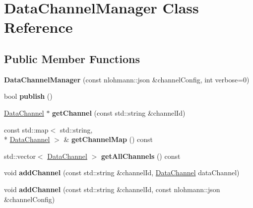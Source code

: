\hypertarget{classDataChannelManager}{\section{Data\-Channel\-Manager Class Reference}
\label{classDataChannelManager}
}
\subsection*{Public Member Functions}
\begin{DoxyCompactItemize}
\item 
\hypertarget{classDataChannelManager_a8d2879feaa1c657c3b48746938be1095}{{\bfseries Data\-Channel\-Manager} (const nlohmann\-::json \&channel\-Config, int verbose=0)}\label{classDataChannelManager_a8d2879feaa1c657c3b48746938be1095}

\item 
\hypertarget{classDataChannelManager_aecd6bf46dbee7dc4b8496c360c52e3a2}{bool {\bfseries publish} ()}\label{classDataChannelManager_aecd6bf46dbee7dc4b8496c360c52e3a2}

\item 
\hypertarget{classDataChannelManager_a523a55ba5c2f31026680f7aa7ab0e318}{\hyperlink{classDataChannel}{Data\-Channel} $\ast$ {\bfseries get\-Channel} (const std\-::string \&channel\-Id)}\label{classDataChannelManager_a523a55ba5c2f31026680f7aa7ab0e318}

\item 
\hypertarget{classDataChannelManager_a3d3c68da7e7333c2a656ae8a0672178c}{const std\-::map$<$ std\-::string, \\*
\hyperlink{classDataChannel}{Data\-Channel} $>$ \& {\bfseries get\-Channel\-Map} () const }\label{classDataChannelManager_a3d3c68da7e7333c2a656ae8a0672178c}

\item 
\hypertarget{classDataChannelManager_a0604e641bd73e015a258506ef66c1dd1}{std\-::vector$<$ \hyperlink{classDataChannel}{Data\-Channel} $>$ {\bfseries get\-All\-Channels} () const }\label{classDataChannelManager_a0604e641bd73e015a258506ef66c1dd1}

\item 
\hypertarget{classDataChannelManager_aacbb944add821588a735a0516888b931}{void {\bfseries add\-Channel} (const std\-::string \&channel\-Id, \hyperlink{classDataChannel}{Data\-Channel} data\-Channel)}\label{classDataChannelManager_aacbb944add821588a735a0516888b931}

\item 
\hypertarget{classDataChannelManager_a8457d3d452228c49ffa1a65250d4a941}{void {\bfseries add\-Channel} (const std\-::string \&channel\-Id, const nlohmann\-::json \&channel\-Config)}\label{classDataChannelManager_a8457d3d452228c49ffa1a65250d4a941}


\end{DoxyCompactItemize}
